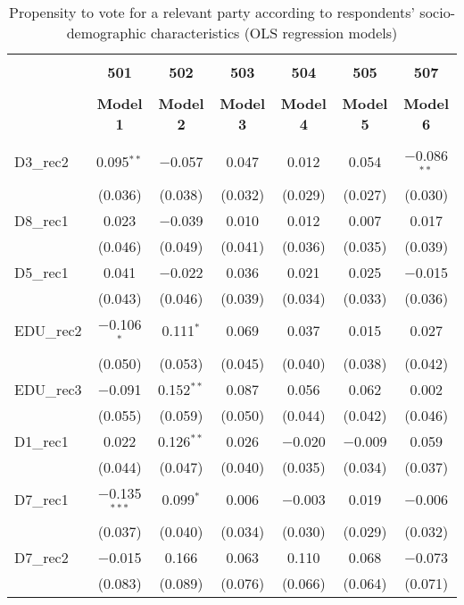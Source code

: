 \documentclass[
]{article}
\begin{document}
\begin{table}[!htbp] \centering 
  \caption{Propensity to vote for a relevant party according to respondents' 
                     socio-demographic characteristics (OLS regression models)} 
  \label{table:full_ols_cy} 
\begin{tabular}{@{\extracolsep{5pt}}lcccccc} 
\\[-1.8ex]\hline \\[-1.8ex] 
 & \textbf{501} & \textbf{502} & \textbf{503} & \textbf{504} & \textbf{505} & \textbf{507} \\ 
\\[-1.8ex] & \textbf{Model 1} & \textbf{Model 2} & \textbf{Model 3} & \textbf{Model 4} & \textbf{Model 5} & \textbf{Model 6}\\ 
\hline \\[-1.8ex] 
 D3\_rec2 & 0.095$^{**}$ & $-$0.057 & 0.047 & 0.012 & 0.054 & $-$0.086$^{**}$ \\ 
  & (0.036) & (0.038) & (0.032) & (0.029) & (0.027) & (0.030) \\ 
  D8\_rec1 & 0.023 & $-$0.039 & 0.010 & 0.012 & 0.007 & 0.017 \\ 
  & (0.046) & (0.049) & (0.041) & (0.036) & (0.035) & (0.039) \\ 
  D5\_rec1 & 0.041 & $-$0.022 & 0.036 & 0.021 & 0.025 & $-$0.015 \\ 
  & (0.043) & (0.046) & (0.039) & (0.034) & (0.033) & (0.036) \\ 
  EDU\_rec2 & $-$0.106$^{*}$ & 0.111$^{*}$ & 0.069 & 0.037 & 0.015 & 0.027 \\ 
  & (0.050) & (0.053) & (0.045) & (0.040) & (0.038) & (0.042) \\ 
  EDU\_rec3 & $-$0.091 & 0.152$^{**}$ & 0.087 & 0.056 & 0.062 & 0.002 \\ 
  & (0.055) & (0.059) & (0.050) & (0.044) & (0.042) & (0.046) \\ 
  D1\_rec1 & 0.022 & 0.126$^{**}$ & 0.026 & $-$0.020 & $-$0.009 & 0.059 \\ 
  & (0.044) & (0.047) & (0.040) & (0.035) & (0.034) & (0.037) \\ 
  D7\_rec1 & $-$0.135$^{***}$ & 0.099$^{*}$ & 0.006 & $-$0.003 & 0.019 & $-$0.006 \\ 
  & (0.037) & (0.040) & (0.034) & (0.030) & (0.029) & (0.032) \\ 
  D7\_rec2 & $-$0.015 & 0.166 & 0.063 & 0.110 & 0.068 & $-$0.073 \\ 
  & (0.083) & (0.089) & (0.076) & (0.066) & (0.064) & (0.071) \\ 

\end{tabular}
\end{table}
\end{document}

